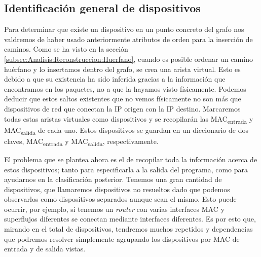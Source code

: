 \documentclass[twoside, 12pt]{epstfg}
\begin{document}
\subsection{Identificación general de dispositivos}
Para determinar que existe un dispositivo en un punto concreto del grafo nos valdremos de haber usado anteriormente atributos de orden para la inserción de caminos. Como se ha visto en la sección \ref{subsec:Analisis:Reconstruccion:Huerfano}, cuando es posible ordenar un camino huérfano y lo insertamos dentro del grafo, se crea una arista virtual. Esto es debido a que su existencia ha sido inferida gracias a la información que encontramos en los paquetes, no a que la hayamos visto físicamente. Podemos deducir que estos saltos existentes que no vemos físicamente no son más que dispositivos de red que conectan la IP origen con la IP destino. Marcaremos todas estas aristas virtuales como dispositivos y se recopilarán las MAC\textsubscript{entrada} y MAC\textsubscript{salida} de cada uno. Estos dispositivos se guardan en un diccionario de dos claves, MAC\textsubscript{entrada} y MAC\textsubscript{salida}, respectivamente.

El problema que se plantea ahora es el de recopilar toda la información acerca de estos dispositivos; tanto para especificarla a la salida del programa, como para ayudarnos en la clasificación posterior. Tenemos una gran cantidad de dispositivos, que llamaremos dispositivos no resueltos dado que podemos observarlos como dispositivos separados aunque sean el mismo. Esto puede ocurrir, por ejemplo, si tenemos un \textit{router} con varias interfaces MAC y superflujos diferentes se conectan mediante interfaces diferentes. Es por esto que, mirando en el total de dispositivos, tendremos muchos repetidos y dependencias que podremos resolver simplemente agrupando los dispositivos por MAC de entrada y de salida vistas.
\end{document}
